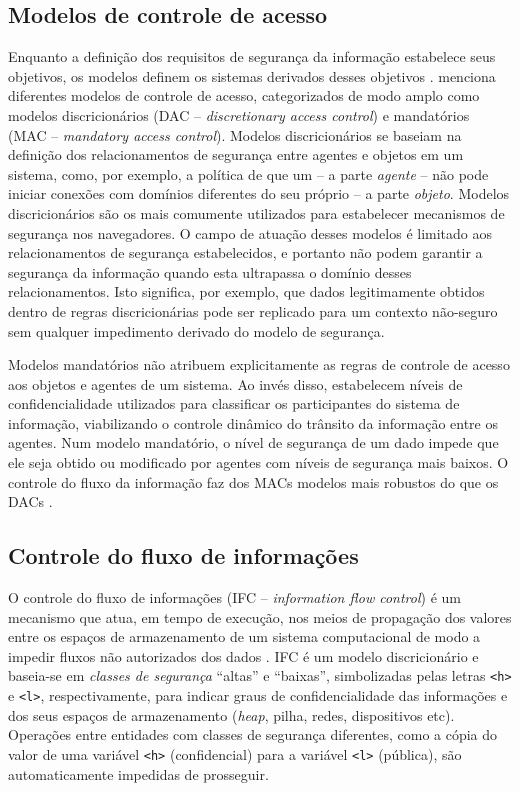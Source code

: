 \subsection{Modelos de controle de acesso}
Enquanto a definição dos requisitos de segurança da informação estabelece seus objetivos, os modelos definem os sistemas derivados desses objetivos \cite{Goguen1982}. \cite{Foster1998} menciona diferentes modelos de controle de acesso, categorizados de modo amplo como modelos discricionários (DAC -- \textit{discretionary access control}) e mandatórios (MAC -- \textit{mandatory access control}). Modelos discricionários se baseiam na definição dos relacionamentos de segurança entre agentes e objetos em um sistema, como, por exemplo, a política de que um \script -- a parte \textit{agente} -- não pode iniciar conexões com domínios diferentes do seu próprio -- a parte \textit{objeto}. Modelos discricionários são os mais comumente utilizados para estabelecer mecanismos de segurança nos navegadores. O campo de atuação desses modelos é limitado aos relacionamentos de segurança estabelecidos, e portanto não podem garantir a segurança da informação quando esta ultrapassa o domínio desses relacionamentos. Isto significa, por exemplo, que dados legitimamente obtidos dentro de regras discricionárias pode ser replicado para um contexto não-seguro sem qualquer impedimento derivado do modelo de segurança.

Modelos mandatórios não atribuem explicitamente as regras de controle de acesso aos objetos e agentes de um sistema. Ao invés disso, estabelecem níveis de confidencialidade utilizados para classificar os participantes do sistema de informação, viabilizando o controle dinâmico do trânsito da informação entre os agentes. Num modelo mandatório, o nível de segurança de um dado impede que ele seja obtido ou modificado por agentes com níveis de segurança mais baixos. O controle do fluxo da informação faz dos MACs modelos mais robustos do que os DACs \cite{Foster1998}.

\subsection{Controle do fluxo de informações}
O controle do fluxo de informações (IFC -- \textit{information flow control}) é um mecanismo que atua, em tempo de execução, nos meios de propagação dos valores entre os espaços de armazenamento de um sistema computacional de modo a impedir fluxos não autorizados dos dados \cite{Denning1976}. IFC é um modelo discricionário e baseia-se em \textit{classes de segurança} ``altas'' e ``baixas'', simbolizadas pelas letras \texttt{<h>} e \texttt{<l>}, respectivamente, para indicar graus de confidencialidade das informações e dos seus espaços de armazenamento (\textit{heap}, pilha, redes, dispositivos etc). Operações entre entidades com classes de segurança diferentes, como a cópia do valor de uma variável \texttt{<h>} (confidencial) para a variável \texttt{<l>} (pública), são automaticamente impedidas de prosseguir.

